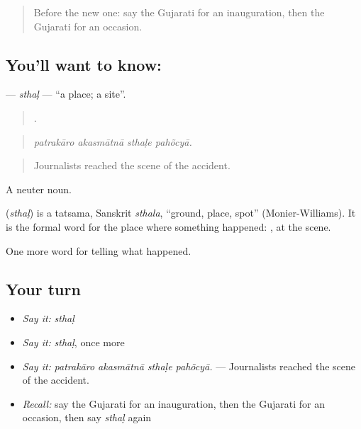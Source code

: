 \label{lesson:GU-C315-sthal}



\begin{quote}
Before the new one: say the Gujarati for an inauguration, then the Gujarati for an occasion.
\end{quote}

\subsection*{You'll want to know: }
\textbf{} — \emph{sthaḷ} — \textquotedblleft{}a place; a site\textquotedblright{}.

\begin{quote}
   .
\end{quote}

\begin{quote}
\emph{patrakāro akasmātnā sthaḷe pahõcyā.}
\end{quote}

\begin{quote}
Journalists reached the scene of the accident.
\end{quote}

A neuter noun.

\begin{cousinweb}
\textbf{} (\emph{sthaḷ}) is a tatsama, Sanskrit \emph{sthala}, \textquotedblleft{}ground, place, spot\textquotedblright{} (Monier-Williams). It is the formal word for the place where something happened: \textbf{ }, at the scene.
\end{cousinweb}

\begin{grammarlens}[title={What you've built}]
One more word for telling what happened.
\end{grammarlens}

\subsection*{Your turn}
\begin{itemize}
\raggedright
  \item \emph{Say it:} \emph{sthaḷ}
  \item \emph{Say it:} \emph{sthaḷ}, once more
  \item \emph{Say it:} \emph{patrakāro akasmātnā sthaḷe pahõcyā.} — Journalists reached the scene of the accident.
  \item \emph{Recall:} say the Gujarati for an inauguration, then the Gujarati for an occasion, then say \emph{sthaḷ} again
\end{itemize}

